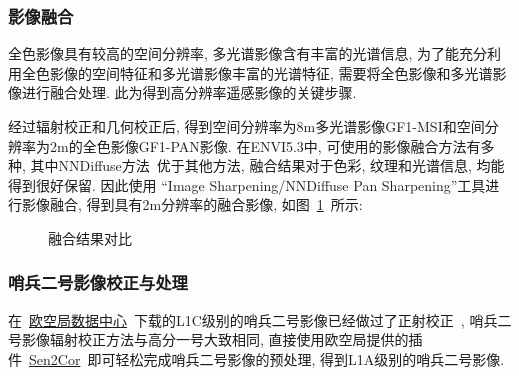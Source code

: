 \subsubsection*{影像融合}
全色影像具有较高的空间分辨率, 多光谱影像含有丰富的光谱信息, 为了能充分利用全色影像的空间特征和多光谱影像丰富的光谱特征, 需要将全色影像和多光谱影像进行融合处理. 此为得到高分辨率遥感影像的关键步骤.

经过辐射校正和几何校正后, 得到空间分辨率为8m多光谱影像GF1-MSI和空间分辨率为2m的全色影像GF1-PAN影像. 在ENVI5.3中, 可使用的影像融合方法有多种, 其中NNDiffuse方法~\cite{NNDfuse}优于其他方法, 融合结果对于色彩, 纹理和光谱信息, 均能得到很好保留. 因此使用 ``Image Sharpening/NNDiffuse Pan Sharpening''工具进行影像融合, 得到具有2m分辨率的融合影像, 如图~\ref{fig:0207}~所示:

\begin{figure}[!htbp]
    \centering
    \quad
    \caption{融合结果对比}
    \label{fig:0207}
\end{figure}

\subsubsection{哨兵二号影像校正与处理}
在~\href{https://scihub.copernicus.eu/dhus/#/home}{欧空局数据中心}~下载的L1C级别的哨兵二号影像已经做过了正射校正~\cite{S2handbook}, 哨兵二号影像辐射校正方法与高分一号大致相同, 直接使用欧空局提供的插件~\href{http://step.esa.int/main/snap-supported-plugins/sen2cor/}{Sen2Cor}~即可轻松完成哨兵二号影像的预处理, 得到L1A级别的哨兵二号影像. 

